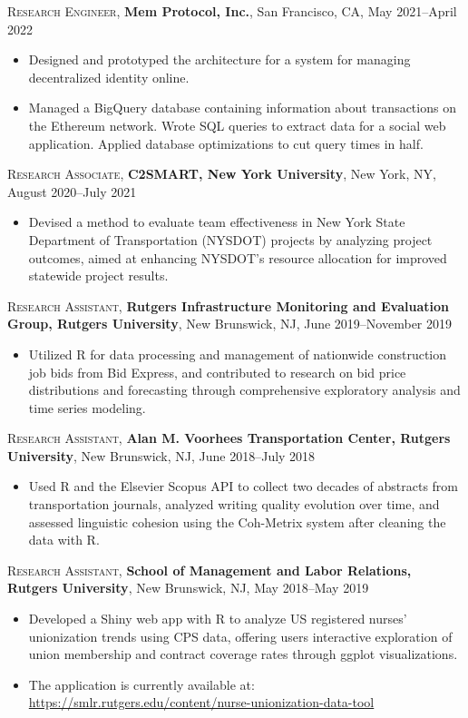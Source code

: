 \documentclass[letterpaper,10pt]{article}
\begin{document}
\textsc{Research Engineer}, \textbf{Mem Protocol, Inc.}, San Francisco, CA, May 2021--April 2022
\begin{itemize}
  \item Designed and prototyped the architecture for a system for managing
        decentralized identity online.
  \item Managed a BigQuery database containing information about transactions on
        the Ethereum network. Wrote SQL queries to extract data for a social web
        application. Applied database optimizations to cut query times in half.
\end{itemize}

\textsc{Research Associate}, \textbf{C2SMART, New York University}, New York, NY, August 2020--July 2021
\begin{itemize}
  \item Devised a method to evaluate team effectiveness in New York State Department of Transportation (NYSDOT) projects
        by analyzing project outcomes, aimed at enhancing NYSDOT's resource allocation for improved statewide project results.
\end{itemize}

\textsc{Research Assistant}, \textbf{Rutgers Infrastructure Monitoring and Evaluation Group, Rutgers University}, New Brunswick, NJ, June 2019--November 2019
\begin{itemize}
  \item Utilized R for data processing and management of nationwide construction job bids from Bid Express, and
        contributed to research on bid price distributions and forecasting through comprehensive exploratory analysis and time
        series modeling.
\end{itemize}

\textsc{Research Assistant}, \textbf{Alan M. Voorhees Transportation Center, Rutgers University}, New Brunswick, NJ, June 2018--July 2018
\begin{itemize}
  \item Used R and the Elsevier Scopus API to collect two decades of abstracts from transportation journals, analyzed
        writing quality evolution over time, and assessed linguistic cohesion using the Coh-Metrix system after cleaning the
        data with R.
\end{itemize}

\textsc{Research Assistant}, \textbf{School of Management and Labor Relations, Rutgers University}, New Brunswick, NJ, May 2018--May 2019
\begin{itemize}
  \item Developed a Shiny web app with R to analyze US registered nurses' unionization trends using CPS data, offering
        users interactive exploration of union membership and contract coverage rates through ggplot visualizations.
  \item The application is currently available at: \url{https://smlr.rutgers.edu/content/nurse-unionization-data-tool}
\end{itemize}
\end{document}
